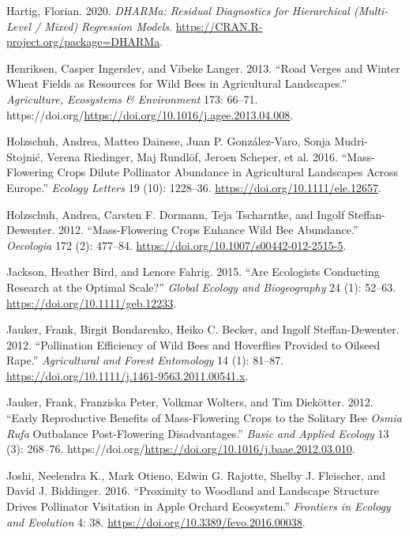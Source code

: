 \documentclass[smallextended]{svjour3}       %
\newlength{\cslhangindent}
\newenvironment{CSLReferences}[2] %
 {%
  \setlength{\parindent}{0pt}
  \ifodd #1 \everypar{\setlength{\hangindent}{\cslhangindent}}\ignorespaces\fi
  \ifnum #2 > 0
  \setlength{\parskip}{#2\baselineskip}
  \fi
 }%
 {}
\begin{document}
\begin{CSLReferences}{1}{0}
\leavevmode{}%
Hartig, Florian. 2020. \emph{DHARMa: Residual Diagnostics for
Hierarchical (Multi-Level / Mixed) Regression Models}.
\url{https://CRAN.R-project.org/package=DHARMa}.

\leavevmode{}%
Henriksen, Casper Ingerslev, and Vibeke Langer. 2013. {``Road Verges and
Winter Wheat Fields as Resources for Wild Bees in Agricultural
Landscapes.''} \emph{Agriculture, Ecosystems \& Environment} 173:
66--71.
https://doi.org/\url{https://doi.org/10.1016/j.agee.2013.04.008}.

\leavevmode{}%
Holzschuh, Andrea, Matteo Dainese, Juan P. González-Varo, Sonja
Mudri-Stojnić, Verena Riedinger, Maj Rundlöf, Jeroen Scheper, et al.
2016. {``Mass-Flowering Crops Dilute Pollinator Abundance in
Agricultural Landscapes Across Europe.''} \emph{Ecology Letters} 19
(10): 1228--36. \url{https://doi.org/10.1111/ele.12657}.

\leavevmode{}%
Holzschuh, Andrea, Carsten F. Dormann, Teja Tscharntke, and Ingolf
Steffan-Dewenter. 2012. {``Mass-Flowering Crops Enhance Wild Bee
Abundance.''} \emph{Oecologia} 172 (2): 477--84.
\url{https://doi.org/10.1007/s00442-012-2515-5}.

\leavevmode{}%
Jackson, Heather Bird, and Lenore Fahrig. 2015. {``Are Ecologists
Conducting Research at the Optimal Scale?''} \emph{Global Ecology and
Biogeography} 24 (1): 52--63. \url{https://doi.org/10.1111/geb.12233}.

\leavevmode{}%
Jauker, Frank, Birgit Bondarenko, Heiko C. Becker, and Ingolf
Steffan-Dewenter. 2012. {``Pollination Efficiency of Wild Bees and
Hoverflies Provided to Oilseed Rape.''} \emph{Agricultural and Forest
Entomology} 14 (1): 81--87.
\url{https://doi.org/10.1111/j.1461-9563.2011.00541.x}.

\leavevmode{}%
Jauker, Frank, Franziska Peter, Volkmar Wolters, and Tim Diekötter.
2012. {``Early Reproductive Benefits of Mass-Flowering Crops to the
Solitary Bee \emph{{O}smia Rufa} Outbalance Post-Flowering
Disadvantages.''} \emph{Basic and Applied Ecology} 13 (3): 268--76.
https://doi.org/\url{https://doi.org/10.1016/j.baae.2012.03.010}.

\leavevmode{}%
Joshi, Neelendra K., Mark Otieno, Edwin G. Rajotte, Shelby J. Fleischer,
and David J. Biddinger. 2016. {``Proximity to Woodland and Landscape
Structure Drives Pollinator Visitation in Apple Orchard Ecosystem.''}
\emph{Frontiers in Ecology and Evolution} 4: 38.
\url{https://doi.org/10.3389/fevo.2016.00038}.


\end{CSLReferences}
\end{document}
